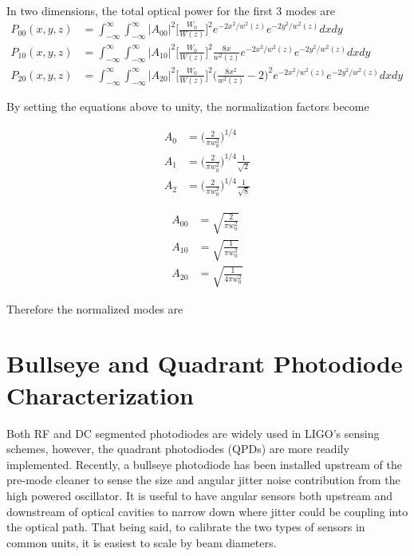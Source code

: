 \begin{appendices}
	In two dimensions, the total optical power for the first 3 modes are
	\begin{equation}
	\label{HGNormalInt2D}
	\begin{aligned}
		P_{00}(x,y,z) 	& 	=	 \int_{-\infty}^{\infty} \int_{-\infty}^{\infty}  \vert A_{00} \vert^2   \bigg[ \frac{W_0}{W(z)} \bigg]^2 e^{-2x^2/w^2(z)}e^{-2y^2/w^2(z)} dx dy&
	\\	P_{10}(x,y,z)	&	=	\int_{-\infty}^{\infty} \int_{-\infty}^{\infty}  \vert A_{10} \vert^2  \bigg[ \frac{W_0}{W(z)} \bigg]^2 \frac{8x}{w^2(z)} e^{-2x^2/w^2(z)}e^{-2y^2/w^2(z)} dx dy&
	\\	P_{20}(x,y,z)	&	= 	\int_{-\infty}^{\infty} \int_{-\infty}^{\infty}  \vert A_{20} \vert^2   \bigg[ \frac{W_0}{W(z)} \bigg]^2 \bigg(\frac{8x^2}{w^2(z)} - 2\bigg)^2 e^{-2x^2/w^2(z)}e^{-2y^2/w^2(z)} dx dy
	\end{aligned}
	\end{equation}
	
	By setting the equations above to unity, the normalization factors become
	
	\begin{equation}
	\begin{aligned}
		A_{0} &	= \bigg( \frac{2}{\pi w_0^2} \bigg)^{1/4} 
	\\	A_{1} &	= \bigg( \frac{2}{\pi w_0^2} \bigg)^{1/4} \frac{1}{\sqrt{2}}
	\\	A_{2} &	= \bigg( \frac{2}{\pi w_0^2} \bigg)^{1/4} \frac{1}{\sqrt{8}}
	\end{aligned}
	\end{equation}
	
	\begin{equation}
	\begin{aligned}
		A_{00} &	= \sqrt{\frac{2}{\pi w_0^2}}
	\\	A_{10} &	= \sqrt{\frac{1}{\pi w_0^2}}
	\\	A_{20} &	= \sqrt{\frac{1}{4\pi w_0^2}}
	\end{aligned}
	\end{equation}
	
	Therefore the normalized modes are
	

	
	\chapter{Bullseye and Quadrant Photodiode Characterization}\label{BPDchar}
	Both RF and DC segmented photodiodes are widely used in LIGO's sensing schemes, however, the quadrant photodiodes (QPDs) are more readily implemented.  Recently, a bullseye photodiode has been installed upstream of the pre-mode cleaner to sense the size and angular jitter noise contribution from the high powered oscillator.  It is useful to have angular sensors both upstream and downstream of optical cavities to narrow down where jitter could be coupling into the optical path.  That being said, to calibrate the two types of sensors in common units, it is easiest to scale by beam diameters.

\end{appendices}

